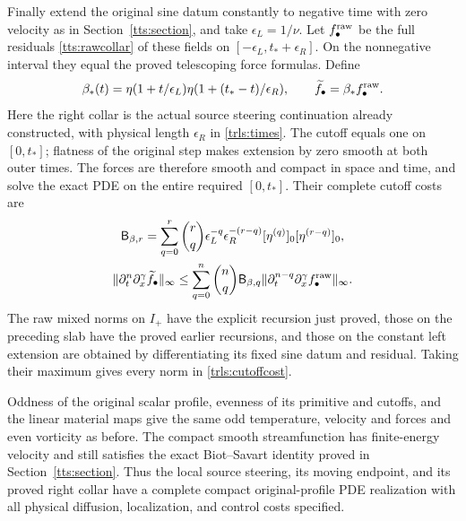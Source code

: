 Finally extend the original sine datum constantly to negative time
with zero velocity as in Section~\ref{tts:section}, and take
$\epsilon_L=1/\nu$. Let $f_\bullet^{\rm raw}$ be the full
residuals \eqref{tts:rawcollar} of these fields on
$[-\epsilon_L,t_*+\epsilon_R]$. On the nonnegative interval
they equal the proved telescoping force formulas. Define
\begin{equation}\label{trls:timecutoff}
 \beta_*(t)=\eta(1+t/\epsilon_L)
             \eta(1+(t_*-t)/\epsilon_R),\qquad
 \widetilde f_\bullet=\beta_*f_\bullet^{\rm raw}.
\end{equation}
Here the right collar is the actual source steering continuation
already constructed, with physical length $\epsilon_R$ in
\eqref{trls:times}. The cutoff equals one on $[0,t_*]$;
flatness of the original step makes extension by zero smooth at
both outer times. The forces are therefore smooth and compact in
space and time, and solve the exact PDE on the entire required
$[0,t_*]$. Their complete cutoff costs are
\begin{equation}\label{trls:cutoffcost}
 \begin{gathered}
 \mathsf B_{\beta,r}=\sum_{q=0}^r\binom rq
      \epsilon_L^{-q}\epsilon_R^{-(r-q)}
       [\eta^{(q)}]_0[\eta^{(r-q)}]_0,\\
 \|\partial_t^n\partial_x^\gamma\widetilde f_\bullet\|_\infty
 \leq\sum_{q=0}^n\binom nq\mathsf B_{\beta,q}
  \|\partial_t^{n-q}\partial_x^\gamma
                                f_\bullet^{\rm raw}\|_\infty.
 \end{gathered}
\end{equation}
The raw mixed norms on $I_+$ have the explicit recursion just
proved, those on the preceding slab have the proved earlier
recursions, and those on the constant left extension are obtained
by differentiating its fixed sine datum and residual. Taking their
maximum gives every norm in \eqref{trls:cutoffcost}.

Oddness of the original scalar profile, evenness of its primitive
and cutoffs, and the linear material maps give the same odd
temperature, velocity and forces and even vorticity as before.
The compact smooth streamfunction has finite-energy velocity and
still satisfies the exact Biot--Savart identity proved in
Section~\ref{tts:section}. Thus the local source steering, its
moving endpoint, and its proved right collar have a complete
compact original-profile PDE realization with all physical
diffusion, localization, and control costs specified.
